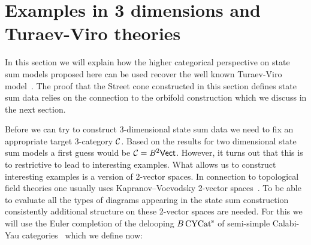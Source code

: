 
\section{Examples in 3 dimensions and Turaev-Viro theories}\label{sec:3D}

In this section we will explain how the higher categorical perspective on state sum models proposed here can be used recover the well known Turaev-Viro model~\cite{Turaev:1992hq,Barrett:1993ab}. The proof that the Street cone constructed in this section defines state sum data relies on the connection to the orbifold construction which we discuss in the next section.

Before we can try to construct 3-dimensional state sum data we need to fix an appropriate target 3-category $\mathcal{C}$. Based on the results for two dimensional state sum models a first guess would be $\mathcal{C}=B^2\mathsf{Vect}$. However, it turns out that this is to restrictive to lead to interesting examples. What allows us to construct interesting examples is a version of 2-vector spaces. In connection to topological field theories one usually uses Kapranov–Voevodsky 2-vector spaces~\cite{2Vect}. To be able to evaluate all the types of diagrams appearing in the state sum construction consistently additional structure on these 2-vector spaces are needed.     
For this we will use the Euler completion of the delooping $B\operatorname{\mathrm{CYCat}^s}$ of semi-simple Calabi-Yau categories~\cite{3DOrb} which we define now:

